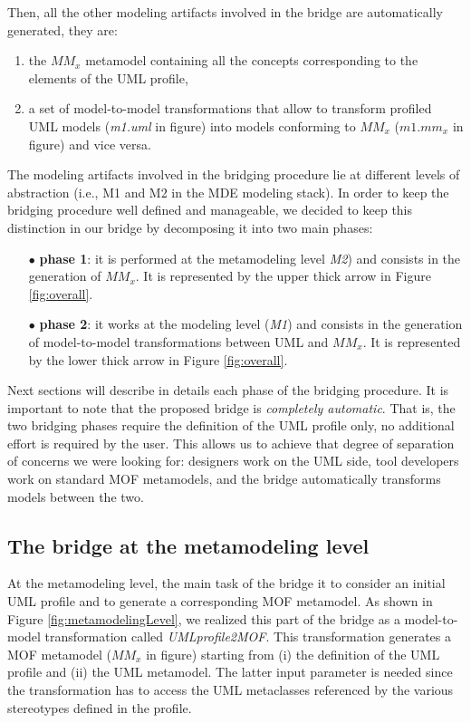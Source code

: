 Then, all the other modeling artifacts involved in the bridge are automatically generated, they are:
\begin{enumerate}
	\item the $MM_x$ metamodel containing all the concepts corresponding to the elements of the UML profile,
	\item a set of model-to-model transformations that allow to transform profiled UML models (\textit{m1.uml} in figure) into models
conforming to $MM_x$ ($m1.mm_x$ in figure) and vice versa.
\end{enumerate}
%
The modeling artifacts involved in the bridging procedure lie at different levels of abstraction  
(i.e., M1 and M2 in the MDE modeling stack). In order to keep the bridging procedure well defined and manageable,
we decided to keep this distinction in our bridge by decomposing it into two main phases: 
%
\begin{itemize}
	\item[$\bullet$] \textbf{phase 1}: it is performed at the metamodeling level \textit{M2}) and consists in the generation of $MM_x$.
	It is represented by the upper thick arrow in Figure \ref{fig:overall}. 
	\item[$\bullet$] \textbf{phase 2}: it works at the modeling level (\textit{M1}) and consists in the generation of model-to-model 
	transformations between UML and $MM_x$. It is represented by the lower thick arrow in Figure \ref{fig:overall}.
\end{itemize}
%
Next sections will describe in details each phase of the bridging procedure.
It is important to note that the proposed bridge is \textit{completely automatic}. That is, the two bridging phases require 
the definition of the UML profile only, no additional effort is required by the user. This allows us to achieve
that degree of separation of concerns we were looking for: designers work on the UML side, tool developers work on standard MOF metamodels,
and the bridge automatically transforms models between the two.


\subsection{The bridge at the metamodeling level}\label{sec:metamodelLevel}
At the metamodeling level, the main task of the bridge it to consider an initial UML profile and to generate a corresponding MOF metamodel.
As shown in Figure \ref{fig:metamodelingLevel}, we realized this part of the bridge as a model-to-model transformation called 
\textit{UMLprofile2MOF}. This transformation generates a MOF metamodel ($MM_x$ in figure) starting from (i) the definition of the UML profile and (ii) the UML metamodel. The latter input parameter is needed since the transformation has to access the UML metaclasses referenced by the 
various stereotypes defined in the profile.

